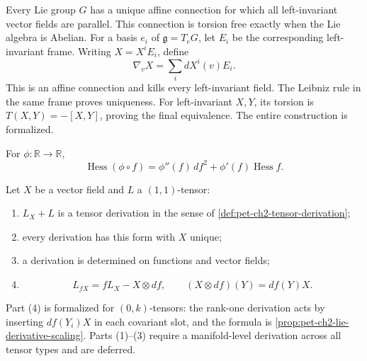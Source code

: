 \begin{remark}
  \label{rem:pet-ch2-ex-14}


  Every Lie group $G$ has a unique affine
  connection for which all left-invariant vector fields are parallel. This
  connection is torsion free exactly when the Lie algebra is Abelian.
  \sketch
  For a basis $e_i$ of $\mathfrak g=T_eG$, let $E_i$ be the corresponding
  left-invariant frame. Writing $X=X^iE_i$, define
  \[
    \nabla_vX=\sum_i dX^i(v)E_i.
  \]
  This is an affine connection and kills every left-invariant field.
  The Leibniz rule in the same frame proves uniqueness. For left-invariant
  $X,Y$, its torsion is $T(X,Y)=-[X,Y]$, proving the final equivalence. The
  entire construction is formalized.
\end{remark}

\begin{remark}
  \label{rem:pet-ch2-ex-15}


  For $\phi:\mathbb{R}\to\mathbb{R}$,
  \[
    \operatorname{Hess}(\phi\circ f)
      =\phi''(f)\,df^2+\phi'(f)\operatorname{Hess}f.
  \]
\end{remark}

\begin{remark}
  \label{rem:pet-ch2-ex-16}


  Let $X$ be a vector field and $L$ a
  $(1,1)$-tensor:
  \begin{enumerate}
    \item $L_X+L$ is a tensor derivation in the sense of
      \cref{def:pet-ch2-tensor-derivation};
    \item every derivation has this form with $X$ unique;
    \item a derivation is determined on functions and vector fields;
    \item
      \[
        L_{fX}=fL_X-X\otimes df,\qquad
        (X\otimes df)(Y)=df(Y)X.
      \]
  \end{enumerate}
  Part (4) is formalized for $(0,k)$-tensors: the rank-one derivation acts by
  inserting $df(Y_i)X$ in each covariant slot, and the formula is
  \cref{prop:pet-ch2-lie-derivative-scaling}. Parts (1)--(3) require a
  manifold-level derivation across all tensor types and are deferred.
\end{remark}

